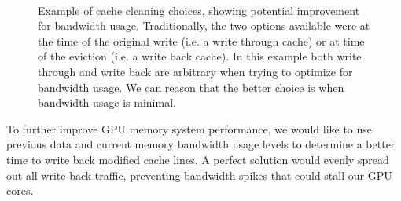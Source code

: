 \begin{figure}[htb]
\begin{center}
\ 
\caption{Example of cache cleaning choices, showing potential improvement for bandwidth usage. Traditionally, the two options available were at the time of the original write (i.e. a write through cache) or at time of the eviction (i.e. a write back cache). In this example both write through and write back are arbitrary when trying to optimize for bandwidth usage. We can reason that the better choice is when bandwidth usage is minimal.}
\label{f:bandwidth_optimal}
\end{center}
\end{figure}
%

To further improve GPU memory system performance, we would like to use previous data and current memory bandwidth usage levels to determine a better time to write back modified cache lines. A perfect solution would evenly spread out all write-back traffic, preventing bandwidth spikes that could stall our GPU cores.
